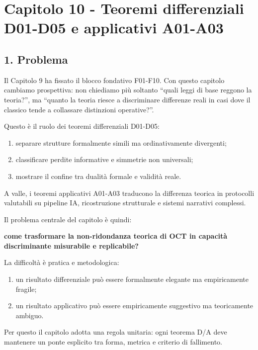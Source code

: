 \chapter{Capitolo 10 - Teoremi differenziali D01-D05 e applicativi A01-A03}

\section{1. Problema}

Il Capitolo 9 ha fissato il blocco fondativo F01-F10. Con questo capitolo cambiamo prospettiva: non chiediamo più soltanto ``quali leggi di base reggono la teoria?'', ma ``quanto la teoria riesce a discriminare differenze reali in casi dove il classico tende a collassare distinzioni operative?''.

Questo è il ruolo dei teoremi differenziali D01-D05:

\begin{enumerate}
\def\labelenumi{\arabic{enumi}.}
\tightlist
\item
  separare strutture formalmente simili ma ordinativamente divergenti;
\item
  classificare perdite informative e simmetrie non universali;
\item
  mostrare il confine tra dualità formale e validità reale.
\end{enumerate}

A valle, i teoremi applicativi A01-A03 traducono la differenza teorica in protocolli valutabili su pipeline IA, ricostruzione strutturale e sistemi narrativi complessi.

Il problema centrale del capitolo è quindi:

\textbf{come trasformare la non-ridondanza teorica di OCT in capacità discriminante misurabile e replicabile?}

La difficoltà è pratica e metodologica:

\begin{enumerate}
\def\labelenumi{\arabic{enumi}.}
\tightlist
\item
  un risultato differenziale può essere formalmente elegante ma empiricamente fragile;
\item
  un risultato applicativo può essere empiricamente suggestivo ma teoricamente ambiguo.
\end{enumerate}

Per questo il capitolo adotta una regola unitaria: ogni teorema D/A deve mantenere un ponte esplicito tra forma, metrica e criterio di fallimento.


